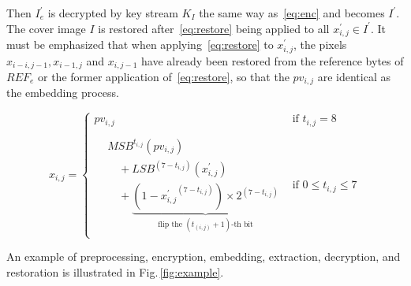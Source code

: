 Then $I_e^\prime$ is decrypted by key stream $K_I$ the same way as~\eqref{eq:enc} and becomes $I^\prime$.
The cover image $I$ is restored after~\eqref{eq:restore} being applied to all $x^\prime_{i, j} \in I^\prime$.
It must be emphasized that when applying~\eqref{eq:restore} to $x^\prime_{i, j}$, the pixels $x_{i - i, j - 1}, x_{i - 1, j}$ and $x_{i, j -1}$ have already been restored from the reference bytes of $REF_e$ or the former application of~\eqref{eq:restore}, so that the $pv_{i, j}$ are identical as the embedding process.




\begin{equation}
	\label{eq:restore}
	x_{i, j} =
	\begin{cases}
		pv_{i, j}                          & \text{if } t_{i, j} = 8 \\
		\\
		\begin{aligned}
			&MSB^{t_{i, j}}(pv_{i, j}) \\
			&\quad + LSB^{(7 - t_{i, j})}(x^\prime_{i, j}) \\
			&\quad + \underbrace{(1 - {x^\prime_{i, j}}^{(7 - t_{i, j})}) \times 2^{(7 - t_{i, j})}}_
			{\text{flip the } (t_{(i, j)}+1) \text{-th bit}} 
		\end{aligned} & \text{if } 0 \leq t_{i, j} \leq 7
	\end{cases}
\end{equation}


An example of preprocessing, encryption, embedding, extraction, decryption, and restoration is illustrated in Fig.\,\ref{fig:example}.



